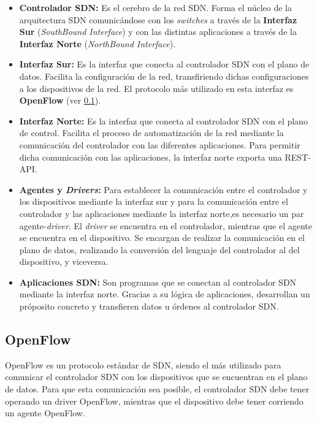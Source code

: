 \begin{itemize}
	\item \textbf{Controlador SDN:} Es el cerebro de la red SDN. Forma el núcleo de la arquitectura SDN comunicándose con los \textit{switches} a través de la \textbf{Interfaz Sur} (\textit{SouthBound Interface}) y con las distintas aplicaciones a través de la \textbf{Interfaz Norte} (\textit{NorthBound Interface}).
	
	\item \textbf{Interfaz Sur:} Es la interfaz que conecta al controlador SDN con el plano de datos. Facilita la configuración de la red, transfiriendo dichas configuraciones a los dispositivos de la red. El protocolo más utilizado en esta interfaz es \textbf{OpenFlow} (ver \ref{subsec:openflow}).
	
	\item \textbf{Interfaz Norte:} Es la interfaz que conecta al controlador SDN con el plano de control. Facilita el proceso de automatización de la red mediante la comunicación del controlador con las diferentes aplicaciones. Para permitir dicha comunicación con las aplicaciones, la interfaz norte exporta una REST-API.
	
	\item \textbf{Agentes y \textit{Drivers}:} Para establecer la comunicación entre el controlador y los dispositivos mediante la interfaz sur y para la comunicación entre el controlador y las aplicaciones mediante la interfaz norte,es necesario un par agente-\textit{driver}. El \textit{driver} se encuentra en el controlador, mientras que el agente se encuentra en el dispositivo. Se encargan de realizar la comunicación en el plano de datos, realizando la conversión del lenguaje del controlador al del dispositivo, y viceversa.
	
	\item \textbf{Aplicaciones SDN:} Son programas que se conectan al controlador SDN mediante la interfaz norte. Gracias a su lógica de aplicaciones, desarrollan un próposito concreto y transfieren datos u órdenes al controlador SDN.
\end{itemize}


\subsection{OpenFlow}
\label{subsec:openflow}

OpenFlow es un protocolo estándar de SDN, siendo el más utilizado para comunicar el controlador SDN con los dispositivos que se encuentran en el plano de datos. Para que esta comunicación sea posible, el controlador SDN debe tener operando un driver OpenFlow, mientras que el dispositivo debe tener corriendo un agente OpenFlow. 


